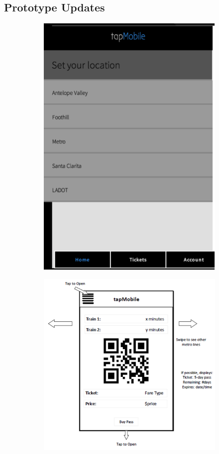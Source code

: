 \subsection{Prototype Updates}
\begin{figure}[!htbp]
\centering
	\begin{subfigure}[t]{0.45\textwidth}
		\includegraphics[scale=0.7]{Prototype/v1.png}
	\end{subfigure}\begin{subfigure}[t]{0.45\textwidth}
		\includegraphics[scale=0.7]{Prototype/v2.png}
	\end{subfigure}
\end{figure}

